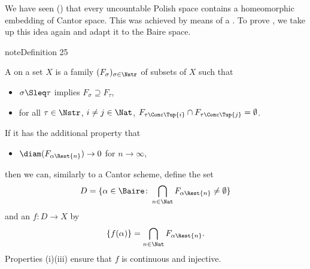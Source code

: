 \documentclass[letterpaper,10pt,english]{jupyterBook}
\begin{document}
\sphinxAtStartPar
We have seen ({\hyperref[\detokenize{polish:thm-Cantor-embedding}]{}}) that every uncountable Polish space contains a homeomorphic embedding of Cantor space. This was achieved by means of a . To prove {\hyperref[\detokenize{imagesBorel:thm-Polish-bijection-Baire}]{}}, we take up this idea again and adapt it to the Baire space.
\label{imagesBorel:def-Lusin-scheme}
\begin{sphinxadmonition}{note}{Definition 25}



\sphinxAtStartPar
A  on a set \(X\) is a family \((F_\sigma)_{\sigma \in \Nstr}\) of subsets of \(X\) such that
\begin{itemize}
\item {} 
\sphinxAtStartPar
{} \(\sigma \Sleq \tau\) implies \(F_\sigma \supseteq F_\tau\),

\item {} 
\sphinxAtStartPar
{} for all \(\tau \in \Nstr\), \(i \neq j \in \Nat\), \(F_{\tau\Conc \Tup{i}} \cap F_{\tau\Conc \Tup{j}} = \emptyset\).

\end{itemize}

\sphinxAtStartPar
If it has the additional property that
\begin{itemize}
\item {} 
\sphinxAtStartPar
{} \(\diam(F_{\alpha \Rest{n}}) \to 0\)  for \(n \to \infty\),

\end{itemize}

\sphinxAtStartPar
then we can, similarly to a Cantor scheme, define the set
\begin{equation*}
    D = \{\alpha \in \Baire \colon \bigcap_{n \in \Nat} F_{\alpha\Rest{n}} \neq \emptyset \}
\end{equation*}
\sphinxAtStartPar
and an  \(f: D \to X\) by
\begin{equation*}
\{f(\alpha)\} = \bigcap_{n \in \Nat} F_{\alpha\Rest{n}}.
\end{equation*}
\sphinxAtStartPar
Properties (i)\sphinxhyphen{}(iii) ensure that \(f\) is continuous and injective.
\end{sphinxadmonition}
\end{document}
